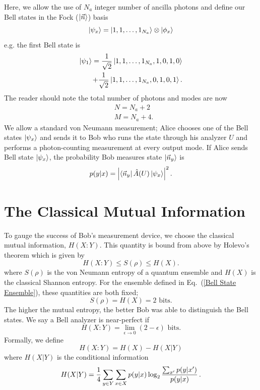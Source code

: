 \documentclass[aps,pra,twocolumn,showpacs,superscriptaddress,floatfix,10pt]{revtex4}
\begin{document}
Here, we allow the use of $N_a$ integer number of ancilla photons and define our Bell states in the Fock ($\ket{\vec{n}}$) basis
\begin{equation}
\label{Bell States Phi}
	\ket{\psi_x} = \ket{1,1,\dots,1_{N_a}} \otimes \ket{\phi_x}
\end{equation}
e.g. the first Bell state is
\begin{eqnarray}
	\ket{\psi_1} = \frac{1}{\sqrt{2}}  \ket{1,1,\dots,1_{N_a},1,0,1,0} \\
	+ \frac{1}{\sqrt{2}} \ket{1,1,\dots,1_{N_a},0,1,0,1}. \nonumber 
\end{eqnarray}
The reader should note the total number of photons and modes are now
\begin{eqnarray}
	& N = N_a + 2 \\
	& M = N_a + 4.
\end{eqnarray}
We allow a standard von Neumann measurement; Alice chooses one of the Bell states $\ket{\psi_x}$ and sends it to Bob who runs the state through his analyzer $U$ and performs a photon-counting measurement at every output mode.
If Alice sends Bell state $\ket{\psi_x}$, the probability Bob measures state $\ket{\vec{n}_y}$ is
\begin{equation}
	\label{Probability of Measurment}
	p( y | x ) = \abs{\bra{\vec{n}_y} \hat{A}(U) \ket{\psi_x}}^2 \, .
\end{equation}
\section{The Classical Mutual Information}
\label{Section on Mutual Entropy}
To gauge the success of Bob's measurement device, we choose the classical mutual information, $H(X:Y)$. This quantity is bound from above by Holevo's theorem which is
given by
\begin{equation}
\label{Holevo Theorem}
H(X:Y) \le S(\rho) \le H(X).
\end{equation}
where $S(\rho)$ is the von Neumann entropy of a quantum ensemble and $H(X)$ is the classical Shannon entropy.
For the ensemble defined in Eq.~(\ref{Bell State Ensemble}), these quantities are both fixed;
\begin{equation}
	S(\rho) = H(X) = \mbox{2 bits}.
\end{equation}
The higher the mutual entropy, the better Bob was able to distinguish the Bell states. We say a Bell analyzer is near-perfect if
\begin{equation}
	\label{Near Perfect Condition}
	H(X:Y) = \lim\limits_{\epsilon \rightarrow 0} (2 - \epsilon) \mbox{ bits.}
\end{equation}
Formally, we define
\begin{equation}
	\label{Mutual Entropy}
	H(X:Y) = H(X) - H(X|Y)
\end{equation}
where $H(X|Y)$ is the conditional information
\begin{equation}
\label{Conditional Entropy}
\small
H(X|Y) = \frac{1}{4} \sum_{y \in Y} \sum_{x \in X} p(y|x) \log_2 \frac{\sum_{x^\prime} p(y|x^\prime)}{p(y|x)}\,.
\end{equation}
\end{document}
